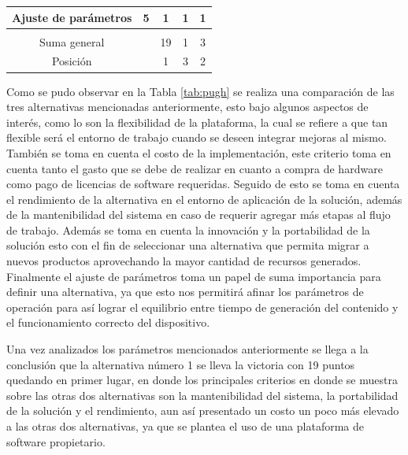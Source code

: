 \documentclass[12pt]{article}
\begin{document}
\begin{table}[h!]
{\begin{tabular}{ccccc}
  \multicolumn{1}{|c|}{\cellcolor[HTML]{93C47D} Ajuste de parámetros} &
    \multicolumn{1}{c|}{5} &
    \multicolumn{1}{c|}{1} &
    \multicolumn{1}{c|}{1} &
    \multicolumn{1}{c|}{1} \\ \hline
  \multicolumn{1}{l}{} &
    \multicolumn{1}{l}{} &
    \multicolumn{1}{l}{} &
    \multicolumn{1}{l}{} &
    \multicolumn{1}{l}{} \\ \hline
  \multicolumn{1}{|c|}{\cellcolor[HTML]{93C47D} Suma general} &
    \multicolumn{1}{l|}{} &
    \multicolumn{1}{c|}{19} &
    \multicolumn{1}{c|}{1} &
    \multicolumn{1}{c|}{3} \\ \hline
  \multicolumn{1}{|c|}{\cellcolor[HTML]{93C47D} Posición} &
    \multicolumn{1}{l|}{} &
    \multicolumn{1}{c|}{1} &
    \multicolumn{1}{c|}{3} &
    \multicolumn{1}{c|}{2} \\ \hline
  \end{tabular}%
  }
  \end{table}

Como se pudo observar en la Tabla \ref{tab:pugh} se realiza una comparación de las tres alternativas mencionadas anteriormente, esto bajo algunos aspectos de interés, como lo son la flexibilidad de la plataforma, la cual se refiere a que tan flexible será el entorno de trabajo cuando se deseen integrar mejoras al mismo. También se toma en cuenta el costo de la implementación, este criterio toma en cuenta tanto el gasto que se debe de realizar en cuanto a compra de hardware como pago de licencias de software requeridas. Seguido de esto se toma en cuenta el rendimiento de la alternativa en el entorno de aplicación de la solución, además de la mantenibilidad del sistema en caso de requerir agregar más etapas al flujo de trabajo. Además se toma en cuenta la innovación y la portabilidad de la solución esto con el fin de seleccionar una alternativa que permita migrar a nuevos productos aprovechando la mayor cantidad de recursos generados. Finalmente el ajuste de parámetros toma un papel de suma importancia para definir una alternativa, ya que esto nos permitirá afinar los parámetros de operación para así lograr el equilibrio entre tiempo de generación del contenido y el funcionamiento correcto del dispositivo.


Una vez analizados los parámetros mencionados anteriormente se llega a la conclusión que la alternativa número 1 se lleva la victoria con 19 puntos quedando en primer lugar, en donde los principales criterios en donde se muestra sobre las otras dos alternativas son la mantenibilidad del sistema, la portabilidad de la solución y el rendimiento, aun así presentado un costo un poco más elevado a las otras dos alternativas, ya que se plantea el uso de una plataforma de software propietario.
  
\end{document}
